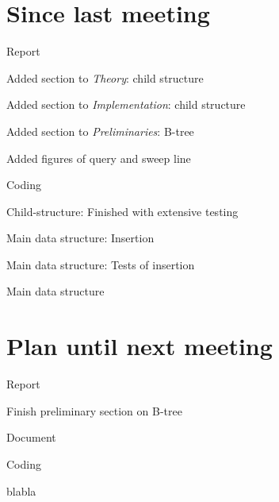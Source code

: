 \documentclass[a4paper,11pt,agenda,chair]{meetingmins}
\begin{document}
\maketitle

\section{Since last meeting}
\begin{items}
\item Report
	\begin{items}
		\item Added section to \textit{Theory}: child structure
		\item Added section to \textit{Implementation}: child structure
        \item Added section to \textit{Preliminaries}: B-tree
        \item Added figures of query and sweep line
	\end{items}
\item Coding
	\begin{items}
		\item Child-structure: Finished with extensive testing
		\item Main data structure: Insertion
		\item Main data structure: Tests of insertion
		\item Main data structure
	\end{items}
\end{items}

\section{Plan until next meeting}
\begin{items}
\item Report
	\begin{items}
		\item Finish preliminary section on B-tree
		\item Document 
	\end{items}
\item Coding
	\begin{items}
		\item blabla
	\end{items}
\end{items}
\end{document}
